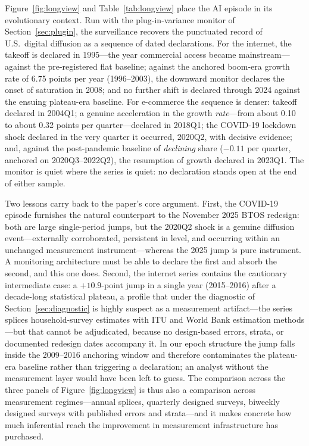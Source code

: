 \documentclass[review,authoryear,12pt]{elsarticle}
\begin{document}
Figure~\ref{fig:longview} and Table~\ref{tab:longview} place the AI episode in its evolutionary context. Run with the plug-in-variance monitor of Section~\ref{sec:plugin}, the surveillance recovers the punctuated record of U.S.\ digital diffusion as a sequence of dated declarations. For the internet, the takeoff is declared in 1995---the year commercial access became mainstream---against the pre-registered flat baseline; against the anchored boom-era growth rate of 6.75 points per year (1996--2003), the downward monitor declares the onset of saturation in 2008; and no further shift is declared through 2024 against the ensuing plateau-era baseline. For e-commerce the sequence is denser: takeoff declared in 2004Q1; a genuine acceleration in the growth \emph{rate}---from about 0.10 to about 0.32 points per quarter---declared in 2018Q1; the COVID-19 lockdown shock declared in the very quarter it occurred, 2020Q2, with decisive evidence; and, against the post-pandemic baseline of \emph{declining} share ($-0.11$ per quarter, anchored on 2020Q3--2022Q2), the resumption of growth declared in 2023Q1. The monitor is quiet where the series is quiet: no declaration stands open at the end of either sample.

Two lessons carry back to the paper's core argument. First, the COVID-19 episode furnishes the natural counterpart to the November 2025 BTOS redesign: both are large single-period jumps, but the 2020Q2 shock is a genuine diffusion event---externally corroborated, persistent in level, and occurring within an unchanged measurement instrument---whereas the 2025 jump is pure instrument. A monitoring architecture must be able to declare the first and absorb the second, and this one does. Second, the internet series contains the cautionary intermediate case: a $+10.9$-point jump in a single year (2015--2016) after a decade-long statistical plateau, a profile that under the diagnostic of Section~\ref{sec:diagnostic} is highly suspect as a measurement artifact---the series splices household-survey estimates with ITU and World Bank estimation methods \citep{fredinternet}---but that cannot be adjudicated, because no design-based errors, strata, or documented redesign dates accompany it. In our epoch structure the jump falls inside the 2009--2016 anchoring window and therefore contaminates the plateau-era baseline rather than triggering a declaration; an analyst without the measurement layer would have been left to guess. The comparison across the three panels of Figure~\ref{fig:longview} is thus also a comparison across measurement regimes---annual splices, quarterly designed surveys, biweekly designed surveys with published errors and strata---and it makes concrete how much inferential reach the improvement in measurement infrastructure has purchased.
\end{document}
